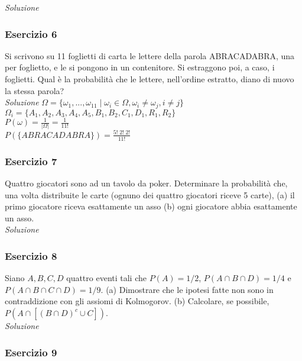 \textit{Soluzione} \quad 

\subsubsection{Esercizio 6} Si scrivono su 11 foglietti di carta le lettere della parola ABRACADABRA, una per foglietto, e le si pongono in un contenitore. Si estraggono poi, a caso, i foglietti. Qual è la probabilità che le lettere, nell’ordine estratto, diano di nuovo la stessa parola?
\\

\textit{Soluzione} \quad 
$\Omega =\{\omega_1,...,\omega_{11} \; | \; \omega_i \in \Omega, \omega_i \ne \omega_j , i\ne j\}$ 
\\

$\Omega_i = \{A_1,A_2,A_3,A_4,A_5,B_1,B_2,C_1,D_1,R_1,R_2\}$ 
\\

$P(\omega)=\frac{1}{|\Omega|}=\frac{1}{11!}$
\\

$P(\{ABRACADABRA\})=\frac{5! \;2!\; 2!}{11!}$

\subsubsection{Esercizio 7} Quattro giocatori sono ad un tavolo da poker. Determinare la probabilità che, una volta distribuite le
carte (ognuno dei quattro giocatori riceve 5 carte),
(a) il primo giocatore riceva esattamente un asso (b) ogni giocatore abbia esattamente un asso.
\\

\textit{Soluzione} \quad 

\subsubsection{Esercizio 8}
Siano $A, B, C, D$ quattro eventi tali che $P (A) = 1/2$, $P (A \cap B \cap D) = 1/4$ e $P (A \cap B \cap C \cap D) = 1/9.$
(a) Dimostrare che le ipotesi fatte non sono in contraddizione con gli assiomi di Kolmogorov. (b) Calcolare, se possibile, $P (A \cap [(B \cap D)^c \cup C ])$.
\\

\textit{Soluzione} \quad 

\subsubsection{Esercizio 9}

